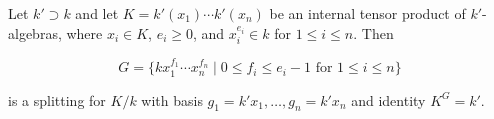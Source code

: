 Let $k' \supset k$ and let $K = k'(x_1) \cdots k'(x_n)$ be an internal tensor product of $k'$-algebras, where $x_i \in K$, $e_i \geq 0$, and $x_i^{e_i} \in k$ for $1 \leq i \leq n$. Then

$$
G = \{ kx_1^{f_1} \cdots x_n^{f_n} \mid 0 \leq f_i \leq e_i - 1 \text{ for } 1 \leq i \leq n \}
$$

is a splitting for $K/k$ with basis $g_1 = k'x_1, \ldots, g_n = k'x_n$ and identity $K^G = k'$.
